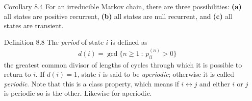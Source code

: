 \begin{boks}{Corollary 8.4}
  For an irreducible Markov chain, there are three possibilities: \textbf{(a)} all states are positive recurrent, \textbf{(b)} all states are null recurrent, and \textbf{(c)} all states are transient.
\end{boks}

\begin{boks}{Definition 8.8}
  The \textit{period} of state $i$ is defined as
  \begin{align*}
    d(i) = \gcd \{ n \geq 1 \ : \ p_{ii}^{(n)} > 0 \}
  \end{align*}
  the greatest common divisor of lengths of cycles through which it is possible to return to $i$. If $d(i) = 1$, state $i$ is said to be \textit{aperiodic}; otherwise it is called \textit{periodic}. Note that this is a class property, which means if $i \leftrightarrow j$ and either $i$ or $j$ is periodic so is the other. Likewise for aperiodic.
\end{boks}

